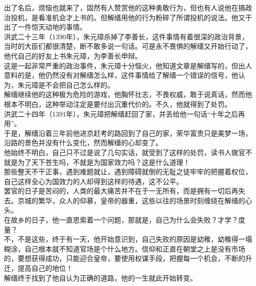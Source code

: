 \begin{multicols}{\theparacolNo}
出了名后，烦恼也就来了，固然有人赞赏他的这种勇敢行为，但也有人说他在搞政治投机，是看准机会才上书的。但解缙用他的行为粉碎了所谓投机的说法。他又干出了一件惊天动地的事情。\\

洪武二十三年（1390年），朱元璋杀掉了李善长，这件事情有着很深的政治背景，当时的大臣们都很清楚，断不敢多说一句话。可是永不畏惧的解缙又开始行动了，他代自己的好友上书朱元璋，为李善长申辩。\\

这是一起非常严重的政治事件，朱元璋十分恼火，他知道文章是解缙写的，但出人意料的是，他仍然没有对解缙怎么样，这件事情给了解缙一个错误的信号，他认为，朱元璋是不会把自己怎么样的。\\

解缙继续他的这种极为危险的游戏，他胸怀壮志，不畏权威，敢于说真话，然而他根本不明白，这种举动注定是要付出沉重代价的。不久，他就得到了处罚。\\

洪武二十四年（1391年），朱元璋把解缙赶回了家，并丢给他一句话“十年之后再用”。\\

于是，解缙沿着三年前他进京赶考的路回到了自己的家，荣华富贵只是美梦一场，沿路的景色并没有什么变化，然而解缙的心却变了。\\

他始终不明白，自己只不过是说了几句实话，就受到了这样的处罚，读书人做官不就是为了天下苍生吗，不就是为国家效力吗？这是什么道理！\\

那些整天不干正事，遇到难题就让，遇到障碍就倒的无耻之徒牢牢的把握着权位，自己这样全心为国效力的人却得到这样的待遇，这不公平。\\

罢官的日子是苦闷的，人类的最大痛苦并不在于一无所有，而是拥有一切后再失去。京城的繁华，众人的仰慕，皇帝的器重，这些以往的场景时刻缠绕在解缙的心头。\\

在故乡的日子，他一直思索着一个问题，那就是，自己为什么会失败？才学？度量？\\

不，不是这些，终于有一天，他开始意识到，自己失败的原因是幼稚，幼稚得一塌糊涂，自己根本就不知道官场是个什么地方。信仰和正直在朝堂之上是没有市场的，要想获得成功，只能迎合皇帝，要使用权谋手段，把握每一个机会，不断的升迁，提高自己的地位！\\

解缙终于找到了他自认为正确的道路，他的一生就此开始转变。\\


\end{multicols}
